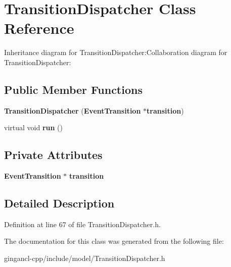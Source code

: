\section{TransitionDispatcher Class Reference}
\label{classbr_1_1pucrio_1_1telemidia_1_1ginga_1_1ncl_1_1model_1_1event_1_1transition_1_1TransitionDispatcher}
Inheritance diagram for TransitionDispatcher:Collaboration diagram for TransitionDispatcher:\subsection*{Public Member Functions}
\begin{CompactItemize}
\item 
\textbf{TransitionDispatcher} ({\bf EventTransition} $\ast${\bf transition})\label{classbr_1_1pucrio_1_1telemidia_1_1ginga_1_1ncl_1_1model_1_1event_1_1transition_1_1TransitionDispatcher_8864fbc41a5619065d8167e56767211c}

\item 
virtual void \textbf{run} ()\label{classbr_1_1pucrio_1_1telemidia_1_1ginga_1_1ncl_1_1model_1_1event_1_1transition_1_1TransitionDispatcher_72fcb26a14f6beb1c3fbace9ab3e7dbb}

\end{CompactItemize}
\subsection*{Private Attributes}
\begin{CompactItemize}
\item 
{\bf EventTransition} $\ast$ {\bf transition}\label{classbr_1_1pucrio_1_1telemidia_1_1ginga_1_1ncl_1_1model_1_1event_1_1transition_1_1TransitionDispatcher_7df952a1fda1ffdc7a377ab8027d00ba}

\end{CompactItemize}


\subsection{Detailed Description}




Definition at line 67 of file TransitionDispatcher.h.

The documentation for this class was generated from the following file:\begin{CompactItemize}
\item 
gingancl-cpp/include/model/TransitionDispatcher.h\end{CompactItemize}
